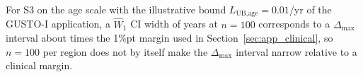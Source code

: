 \documentclass[AMA,Times1COL]{WileyNJDv5}
\begin{document}
For S3 on the age scale with the illustrative bound $L_{\text{UB,age}} = 0.01$/yr of the GUSTO-I application, a $\widehat{W}_1$ CI width of  years at $n = 100$ corresponds to a $\Delta_{\max}$ interval about  times the 1\%pt margin used in Section~\ref{sec:app_clinical}, so $n = 100$ per region does not by itself make the $\Delta_{\max}$ interval narrow relative to a clinical margin.

\end{document}
